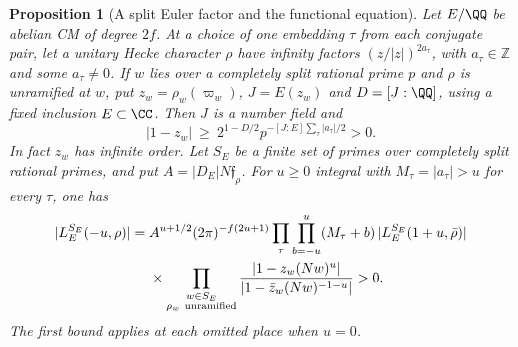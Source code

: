 \documentclass[a4paper,11pt]{article}
\newtheorem{proposition}{Proposition}[section]
\theoremstyle{definition}
\theoremstyle{remark}
\newcommand{\ZZ}{\mathbb Z}\newcommand{\ord}{\operatorname{ord}}
\numberwithin{equation}{section}
\begin{document}
\begin{proposition}[A split Euler factor and the functional equation]\leavevmode
\label{prop:splitvalue257}
Let \(E/\QQ\) be abelian CM of degree \(2f\). At a choice of one
embedding \(\tau\) from each conjugate pair, let a unitary Hecke
character \(\rho\) have infinity factors
\((z/|z|)^{2a_\tau}\), with \(a_\tau\in\ZZ\) and some
\(a_\tau\ne0\). If \(w\) lies over a completely split rational
prime \(p\) and \(\rho\) is unramified at \(w\), put
\(z_w=\rho_w(\varpi_w)\), \(J=E(z_w)\) and \(D=[J:\QQ]\), using a
fixed inclusion \(E\subset\CC\). Then \(J\) is a number field and
\[
 |1-z_w|\ \ge\
        2^{1-D/2}p^{-[J:E]\sum_\tau|a_\tau|/2}>0 .
\]
In fact \(z_w\) has infinite order. Let \(S_E\) be a finite set of
primes over completely split rational primes, and put
\(A=|D_E|N\mathfrak f_\rho\). For \(u\ge0\) integral with
\(M_\tau=|a_\tau|>u\) for every \(\tau\), one has
\[
\begin{aligned}
 |L_E^{S_E}(-u,\rho)|
   ={}& A^{u+1/2}(2\pi)^{-f(2u+1)}
       \prod_\tau\prod_{b=-u}^{u}(M_\tau+b)\,
       |L_E^{S_E}(1+u,\bar\rho)|\\
    &{}\times
       \prod_{\substack{w\in S_E\\ \rho_w\ {\rm unramified}}}
       \frac{|1-z_w(Nw)^u|}
            {|1-\bar z_w(Nw)^{-1-u}|}>0 .
\end{aligned}
\]
The first bound applies at each omitted place when \(u=0\).
\end{proposition}
\end{document}
